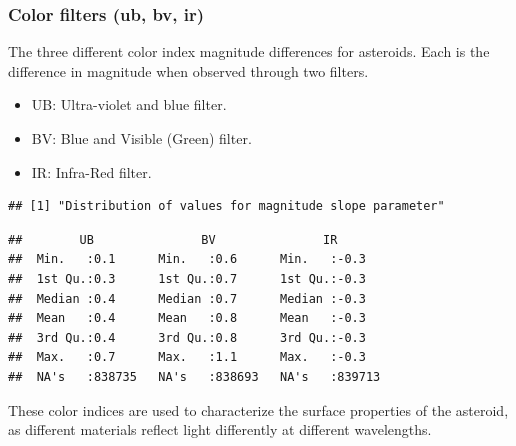 \documentclass[
]{article}
\begin{document}
\hypertarget{color-filters-ub-bv-ir}{%
\subsubsection{Color filters (ub, bv,
ir)}\label{color-filters-ub-bv-ir}}

The three different color index magnitude differences for asteroids.
Each is the difference in magnitude when observed through two filters.

\begin{itemize}
\item
  UB: Ultra-violet and blue filter.
\item
  BV: Blue and Visible (Green) filter.
\item
  IR: Infra-Red filter.
\end{itemize}

\begin{verbatim}
## [1] "Distribution of values for magnitude slope parameter"
\end{verbatim}

\begin{verbatim}
##        UB               BV               IR        
##  Min.   :0.1      Min.   :0.6      Min.   :-0.3    
##  1st Qu.:0.3      1st Qu.:0.7      1st Qu.:-0.3    
##  Median :0.4      Median :0.7      Median :-0.3    
##  Mean   :0.4      Mean   :0.8      Mean   :-0.3    
##  3rd Qu.:0.4      3rd Qu.:0.8      3rd Qu.:-0.3    
##  Max.   :0.7      Max.   :1.1      Max.   :-0.3    
##  NA's   :838735   NA's   :838693   NA's   :839713
\end{verbatim}

These color indices are used to characterize the surface properties of
the asteroid, as different materials reflect light differently at
different wavelengths.
\end{document}
